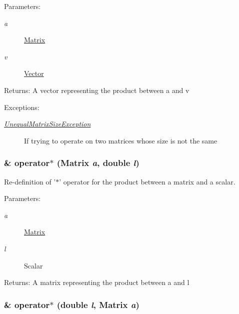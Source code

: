 \begin{Desc}
\item[Parameters:]
\begin{description}
\item[{\em a}]\hyperlink{classgrassmann_1_1Matrix}{Matrix} \item[{\em v}]\hyperlink{classgrassmann_1_1Vector}{Vector} \end{description}
\end{Desc}
\begin{Desc}
\item[Returns:]A vector representing the product between a and v \end{Desc}
\begin{Desc}
\item[Exceptions:]
\begin{description}
\item[{\em \hyperlink{classgrassmann_1_1UnequalMatrixSizeException}{UnequalMatrixSizeException}}]If trying to operate on two matrices whose size is not the same \end{description}
\end{Desc}
\hypertarget{classgrassmann_1_1Matrix_91ab0c09218b5b306a7ae46dd1ae6b71}{
\subsubsection[operator$\ast$]{\& operator$\ast$ ({\bf Matrix} {\em a}, \/  double {\em l})}}
\label{classgrassmann_1_1Matrix_91ab0c09218b5b306a7ae46dd1ae6b71}


Re-definition of '$\ast$' operator for the product between a matrix and a scalar. 

\begin{Desc}
\item[Parameters:]
\begin{description}
\item[{\em a}]\hyperlink{classgrassmann_1_1Matrix}{Matrix} \item[{\em l}]Scalar \end{description}
\end{Desc}
\begin{Desc}
\item[Returns:]A matrix representing the product between a and l \end{Desc}
\hypertarget{classgrassmann_1_1Matrix_dfe35f7b86d2a6a1ea631d20038b88c9}{
\subsubsection[operator$\ast$]{\& operator$\ast$ (double {\em l}, \/  {\bf Matrix} {\em a})}}
\label{classgrassmann_1_1Matrix_dfe35f7b86d2a6a1ea631d20038b88c9}


